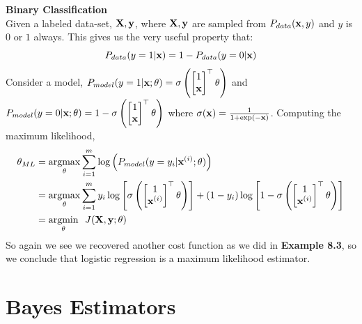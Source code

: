 \begin{example}
    \textbf{Binary Classification}\\
     \indent Given a labeled data-set, $\MX, \vy$, where $\MX, \vy$ are sampled from $P_{data}(\vx,y)$ and $y$ is $0$ or $1$ always. This gives us the very useful property that: 
    $$P_{data}(y=1|\vx) = 1-P_{data}(y=0|\vx)$$
    Consider a model, $P_{model}(y=1|\vx;\vtheta) = \sigma\left( \begin{bmatrix}1 \\ \vx \end{bmatrix}^\top \vtheta\right)$ and $P_{model}(y=0|\vx;\vtheta) = 1-\sigma\left( \begin{bmatrix}1 \\ \vx \end{bmatrix}^\top \vtheta\right)$  where $\sigma(\vx) = \frac{1}{1+\exp(-\vx)}$.
    Computing the maximum likelihood, 
    \begin{align*}
        \vtheta_{ML} &= \underset{\vtheta}{\argmax}\sum_{i=1}^m\log\left(P_{model}(y = y_i|\vx^{(i)};\vtheta) \right)\\
        &=\underset{\vtheta}{\argmax}\sum_{i=1}^my_i\log\left[\sigma\left( \begin{bmatrix}1 \\ \vx^{(i)} \end{bmatrix}^\top \vtheta\right) \right]+(1-y_i)\log\left[1-\sigma\left( \begin{bmatrix}1 \\ \vx^{(i)} \end{bmatrix}^\top \vtheta\right) \right] \\
        &= \underset{\vtheta}{\argmin} \ \ J(\MX, \vy; \theta)
    \end{align*}
    So again we see we recovered another cost function as we did in \textbf{Example 8.3}, so we conclude that logistic regression is a maximum likelihood estimator. 
\end{example}


\section{Bayes Estimators}

